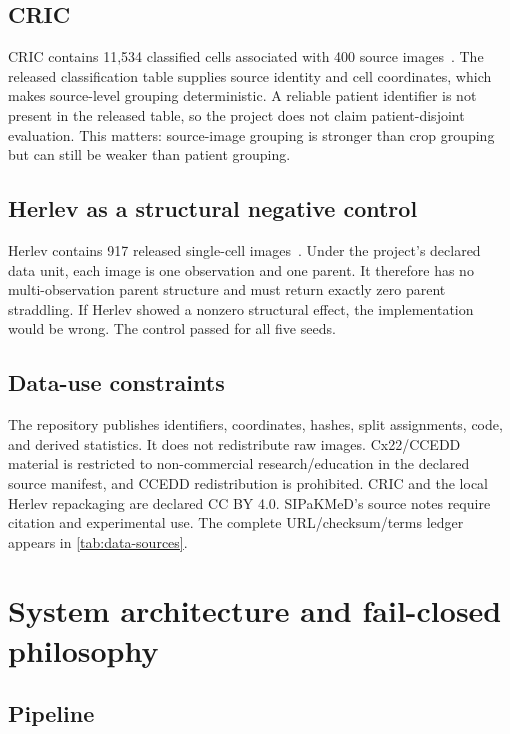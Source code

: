 \documentclass[11pt,oneside]{report}
\begin{document}
\section{CRIC}

CRIC contains 11,534 classified cells associated with 400 source images~\cite{rezende2021cric}. The released classification table supplies source identity and cell coordinates, which makes source-level grouping deterministic. A reliable patient identifier is not present in the released table, so the project does not claim patient-disjoint evaluation. This matters: source-image grouping is stronger than crop grouping but can still be weaker than patient grouping.

\section{Herlev as a structural negative control}

Herlev contains 917 released single-cell images~\cite{jantzen2005pap}. Under the project's declared data unit, each image is one observation and one parent. It therefore has no multi-observation parent structure and must return exactly zero parent straddling. If Herlev showed a nonzero structural effect, the implementation would be wrong. The control passed for all five seeds.

\section{Data-use constraints}

The repository publishes identifiers, coordinates, hashes, split assignments, code, and derived statistics. It does not redistribute raw images. Cx22/CCEDD material is restricted to non-commercial research/education in the declared source manifest, and CCEDD redistribution is prohibited. CRIC and the local Herlev repackaging are declared CC BY 4.0. SIPaKMeD's source notes require citation and experimental use. The complete URL/checksum/terms ledger appears in \cref{tab:data-sources}.

\chapter{System architecture and fail-closed philosophy}

\section{Pipeline}
\end{document}
